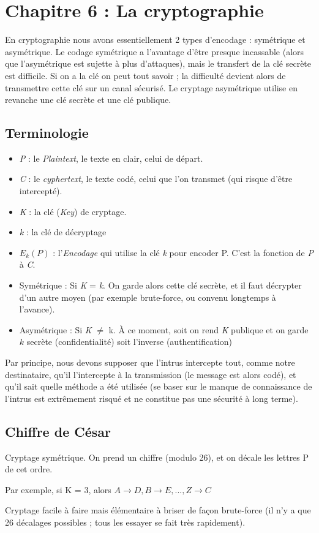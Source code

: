 \documentclass[11pt,a4paper]{article}
\renewcommand{\)}{\right)}
\renewcommand{\(}{\left(}
\begin{document}
\section[Cryptographie]{Chapitre 6 : La cryptographie}
En cryptographie nous avons essentiellement 2 types d'encodage : symétrique et asymétrique. Le codage symétrique a l'avantage d'être presque incassable (alors que l'asymétrique est sujette à plus d'attaques), mais le transfert de la clé secrète est difficile. Si on a la clé on peut tout savoir ; la difficulté devient alors de transmettre cette clé sur un canal sécurisé. Le cryptage asymétrique utilise en revanche une clé secrète et une clé publique.
\subsection{Terminologie}
\begin{multicols}{2}
	\begin{itemize}
		\item 	\textit{P} : le \textit{Plaintext}, le texte en clair, celui de départ.
		\item 	\textit{C} : le \textit{cyphertext}, le texte codé, celui que l'on transmet (qui risque d'être intercepté).		
		\item 	\textit{K} : la clé (\textit{Key}) de cryptage.
		\item	\textit{k} : la clé de décryptage 
		\item 	$E_k(P)$ : l'\textit{Encodage} qui utilise la clé \textit{k} pour encoder P. C'est la fonction de \textit{P} à \textit{C}.
		\item 	Symétrique : Si \textit{K} = \textit{k}. On garde alors cette clé secrète, et il faut décrypter d'un autre moyen (par exemple brute-force, ou convenu longtemps à l'avance).
		\item 	Asymétrique : Si \textit{K} $\neq$ k. À ce moment, soit on rend \textit{K} publique et on garde $k$ secrète (confidentialité) soit l'inverse (authentification)
	\end{itemize}
\end{multicols}
Par principe, nous devons supposer que l'intrus intercepte tout, comme notre destinataire, qu'il l'intercepte à la transmission (le message est alors codé), et qu'il sait quelle méthode a été utilisée (se baser sur le manque de connaissance de l'intrus est extrêmement risqué et ne constitue pas une sécurité à long terme).
\subsection{Chiffre de César}
Cryptage symétrique. On prend un chiffre (modulo 26), et on décale les lettres P de cet ordre. 
\begin{exemple}[0.65]
	Par exemple, si K = 3, alors $A \to D, B\to E,...,Z\to C$
\end{exemple}
Cryptage facile à faire mais élémentaire à briser de façon brute-force (il n'y a que 26 décalages possibles ; tous les essayer se fait très rapidement).
\end{document}
